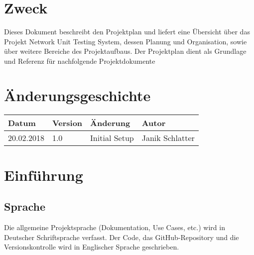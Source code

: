 \documentclass[
	ngerman,
	toc=listof, %
	toc=bibliography, %
	footnotes=multiple, %
	parskip=half, %
	numbers=noendperiod %
]{scrartcl}
\newcommand{\vorlagenOrdner}{../../99_Vorlagen} %
\begin{document}
\thispagestyle{plain}

\cleardoublepage


\section*{Zweck}
Dieses Dokument beschreibt den Projektplan und liefert eine Übersicht über das Projekt Network Unit Testing System, dessen Planung und Organisation, sowie über weitere Bereiche des Projektaufbaus. Der Projektplan dient als Grundlage und Referenz für nachfolgende Projektdokumente

\section*{Änderungsgeschichte}
\begin{tabularx}{0.9\textwidth}{llXl}
	\toprule
	Datum & Version & Änderung & Autor \\
	\midrule
	20.02.2018 & 1.0 & Initial Setup & Janik Schlatter \\
	\bottomrule
\end{tabularx}
\cleardoublepage

{}
\tableofcontents
\cleardoublepage

\let\stdsection\section
\renewcommand\section{\clearpage\stdsection}

\section{Einführung}

	\subsection{Sprache}
		Die allgemeine Projektsprache (Dokumentation, Use Cases, etc.) wird in Deutscher Schriftsprache verfasst.
		Der Code, das GitHub-Repository und die Versionskontrolle wird in Englischer Sprache geschrieben.
\end{document}
